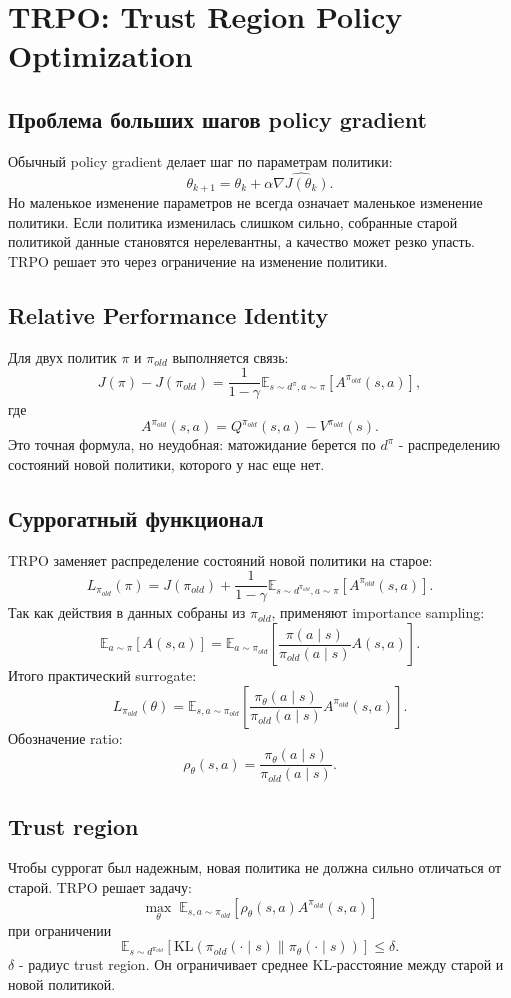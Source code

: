 \documentclass[11pt,a4paper]{article}
\newcommand{\E}{\mathbb{E}}
\newcommand{\KL}{\mathrm{KL}}
\newcommand{\1}{\mathbf{1}}
\begin{document}
\newpage
\section{TRPO: Trust Region Policy Optimization}

\subsection*{Проблема больших шагов policy gradient}
Обычный policy gradient делает шаг по параметрам политики:
\[
    \theta_{k+1}=\theta_k+\alpha\widehat{\nabla J(\theta_k)}.
\]
Но маленькое изменение параметров не всегда означает маленькое изменение политики. Если политика изменилась слишком сильно, собранные старой политикой данные становятся нерелевантны, а качество может резко упасть. TRPO решает это через ограничение на изменение политики.

\subsection*{Relative Performance Identity}
Для двух политик $\pi$ и $\pi_{old}$ выполняется связь:
\[
    J(\pi)-J(\pi_{old})=\frac1{1-\gamma}\E_{s\sim d^\pi,a\sim\pi}\left[A^{\pi_{old}}(s,a)\right],
\]
где
\[
    A^{\pi_{old}}(s,a)=Q^{\pi_{old}}(s,a)-V^{\pi_{old}}(s).
\]
Это точная формула, но неудобная: матожидание берется по $d^\pi$ - распределению состояний новой политики, которого у нас еще нет.

\subsection*{Суррогатный функционал}
TRPO заменяет распределение состояний новой политики на старое:
\[
    L_{\pi_{old}}(\pi)=J(\pi_{old})+\frac1{1-\gamma}
    \E_{s\sim d^{\pi_{old}},a\sim\pi}\left[A^{\pi_{old}}(s,a)\right].
\]
Так как действия в данных собраны из $\pi_{old}$, применяют importance sampling:
\[
    \E_{a\sim\pi}[A(s,a)]
    =\E_{a\sim\pi_{old}}\left[\frac{\pi(a\mid s)}{\pi_{old}(a\mid s)}A(s,a)\right].
\]
Итого практический surrogate:
\[
    L_{\pi_{old}}(\theta)=\E_{s,a\sim\pi_{old}}
    \left[\frac{\pi_\theta(a\mid s)}{\pi_{old}(a\mid s)}A^{\pi_{old}}(s,a)\right].
\]
Обозначение ratio:
\[
    \rho_\theta(s,a)=\frac{\pi_\theta(a\mid s)}{\pi_{old}(a\mid s)}.
\]

\subsection*{Trust region}
Чтобы суррогат был надежным, новая политика не должна сильно отличаться от старой. TRPO решает задачу:
\[
    \max_\theta \; \E_{s,a\sim\pi_{old}}
    \left[\rho_\theta(s,a)A^{\pi_{old}}(s,a)\right]
\]
при ограничении
\[
    \E_{s\sim d^{\pi_{old}}}\left[\KL\left(\pi_{old}(\cdot\mid s)\|\pi_\theta(\cdot\mid s)\right)\right]
    \le \delta.
\]
$\delta$ - радиус trust region. Он ограничивает среднее KL-расстояние между старой и новой политикой.
\end{document}
